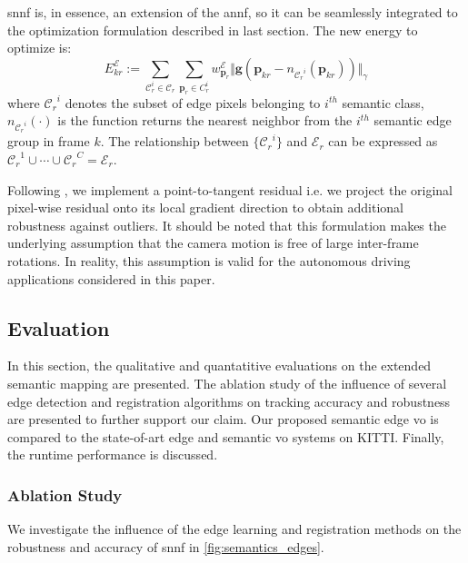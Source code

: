 \acrshort{snnf} is, in essence, an extension of the \acrshort{annf}, so it can be seamlessly
integrated to the optimization formulation described in last section. 
The new energy to optimize is: 
\begin{equation} \label{eq:semantics_optimization}
E_{kr}^{\mathcal{E}} :=  \sum_{\mathcal{C}_r^i \in \mathcal{C}_r}\sum_{\mathbf{p}_{r} \in \mathit{C}_r^{i} } w_{\mathbf{p}_r}^{\mathcal{E}} \Vert \mathbf{g}(\mathbf{p}_{kr} - \mathit{n}_{{\mathcal{C}_r}^i}(\mathbf{p}_{kr})) \Vert_{\gamma}
\end{equation} 
where ${\mathcal{C}_r}^i$ denotes the subset of edge pixels belonging to
$i^{th}$ semantic class, $n_{{\mathcal{C}_r}^i}(\cdot)$ is the function returns the nearest neighbor from the $i^{th}$ semantic edge group in frame $k$. 
The relationship between $\lbrace {\mathcal{C}_r}^i \rbrace$ and
$\mathcal{E}_r$ can be expressed as $ {\mathcal{C}_r}^1\cup \cdots \cup
{\mathcal{C}_r}^C = \mathcal{E}_r $.

Following \cite{zhou2017semi}, we implement a point-to-tangent residual i.e. 
we project the original pixel-wise residual onto its local gradient direction to obtain additional robustness against outliers. 
It should be noted that this formulation makes the underlying assumption that the camera motion is free of large inter-frame rotations. In reality, this assumption is valid for the autonomous driving applications considered in this paper. 

\subsection{Evaluation}

In this section, the qualitative and quantatitive evaluations on the extended semantic mapping are presented.
The ablation study of the influence of several edge detection and registration algorithms on tracking accuracy and robustness are presented to further support our claim. 
Our proposed semantic edge \acrshort{vo} is compared to the state-of-art edge and semantic \acrshort{vo} systems on KITTI. 
Finally, the runtime performance is discussed.

\subsubsection{Ablation Study}
We investigate the influence of the edge learning and registration methods on the robustness and accuracy of \acrshort{snnf} in \ref{fig:semantics_edges}. 

